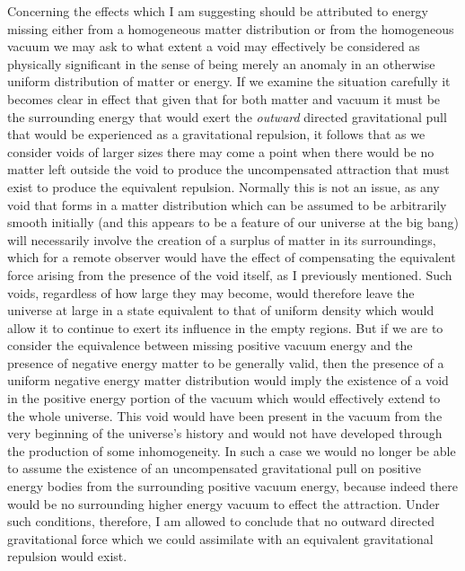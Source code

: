 \documentclass[notitlepage,12pt]{report}
\begin{document}
\noindent Concerning the effects which I am suggesting should be attributed to energy missing either from a homogeneous matter distribution or from the homogeneous vacuum we may ask to what extent a void may effectively be considered as physically significant in the sense of being merely an anomaly in an otherwise uniform distribution of matter or energy. If we examine the situation carefully it becomes clear in effect that given that for both matter and vacuum it must be the surrounding energy that would exert the \textit{outward} directed gravitational pull that would be experienced as a gravitational repulsion, it follows that as we consider voids of larger sizes there may come a point when there would be no matter left outside the void to produce the uncompensated attraction that must exist to produce the equivalent repulsion. Normally this is not an issue, as any void that forms in a matter distribution which can be assumed to be arbitrarily smooth initially (and this appears to be a feature of our universe at the big bang) will necessarily involve the creation of a surplus of matter in its surroundings, which for a remote observer would have the effect of compensating the equivalent force arising from the presence of the void itself, as I previously mentioned. Such voids, regardless of how large they may become, would therefore leave the universe at large in a state equivalent to that of uniform density which would allow it to continue to exert its influence in the empty regions. But if we are to consider the equivalence between missing positive vacuum energy and the presence of negative energy matter to be generally valid, then the presence of a uniform negative energy matter distribution would imply the existence of a void in the positive energy portion of the vacuum which would effectively extend to the whole universe. This void would have been present in the vacuum from the very beginning of the universe's history and would not have developed through the production of some inhomogeneity. In such a case we would no longer be able to assume the existence of an uncompensated gravitational pull on positive energy bodies from the surrounding positive vacuum energy, because indeed there would be no surrounding higher energy vacuum to effect the attraction. Under such conditions, therefore, I am allowed to conclude that no outward directed gravitational force which we could assimilate with an equivalent gravitational repulsion would exist.
\end{document}
